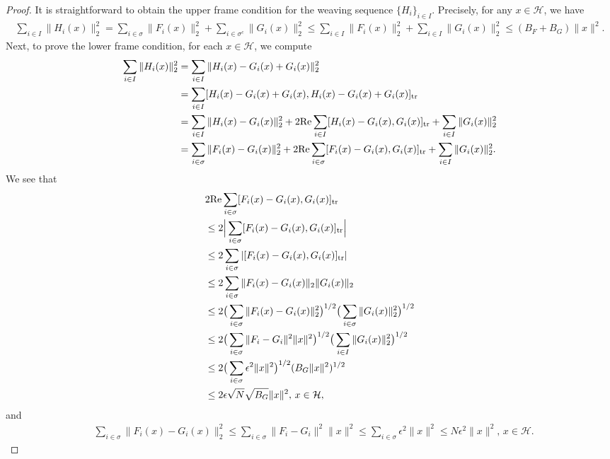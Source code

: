 \documentclass[reqno]{amsart}
\theoremstyle{plain}
\theoremstyle{remark}
\numberwithin{equation}{section}
\begin{document}
\begin{proof}
It is straightforward to obtain the upper frame condition for the weaving sequence $\{H_i\}_{i \in I}$. Precisely, for any $x \in \mathcal{H}$, we have
\begin{align*}
\sum_{i \in I} \|H_i(x)\|_2^2 =\sum_{i \in \sigma} \|F_i(x)\|_2^2 +\sum_{i \in \sigma^c} \|G_i(x)\|_2^2 \leq \sum_{i \in I} \|F_i(x)\|_2^2+\sum_{i \in I} \|G_i(x)\|_2^2 \leq (B_F + B_G)\|x\|^2.
\end{align*}
Next, to prove the lower frame condition, for each $x \in \mathcal{H}$, we compute
\begin{align}\label{eq2.1}
\sum_{i \in I} \|H_i(x)\|_2^2 &=\sum_{i \in I} \|H_i(x)-G_i(x)+G_i(x)\|_2^2\notag\\
& =\sum_{i \in I}[ H_i(x)-G_i(x)+G_i(x), H_i(x)-G_i(x)+G_i(x)]_{\text{tr}}\notag\\
&= \sum_{i \in I} \|H_i(x)-G_i(x)\|_2^2 + 2 \text{Re} \sum_{i \in I} [ H_i(x)-G_i(x), G_i(x) ]_{\text{tr}} + \sum_{i \in I} \|G_i(x)\|_2^2\notag\\
&= \sum_{i \in \sigma} \|F_i(x)-G_i(x)\|_2^2 + 2 \text{Re} \sum_{i \in \sigma} [ F_i(x)-G_i(x), G_i(x) ]_{\text{tr}} + \sum_{i \in I} \|G_i(x)\|_2^2.
\end{align}
We see that
\begin{align}\label{eq2.2}
&2 \text{Re} \sum_{i \in \sigma} [ F_i(x)-G_i(x), G_i(x) ]_{\text{tr}} \notag\\
& \leq 2 \Big|\sum_{i \in \sigma} [ F_i(x)-G_i(x), G_i(x) ]_{\text{tr}} \Big|\notag\\
& \leq 2 \sum_{i \in \sigma}| [ F_i(x)-G_i(x), G_i(x) ]_{\text{tr}}| \notag\\
& \leq 2 \sum_{i \in \sigma}\| F_i(x)-G_i(x)\|_2\| G_i(x)\|_2 \notag\\
&\leq 2 \big(\sum_{i \in \sigma}\| F_i(x)-G_i(x)\|_2^2\big)^{1/2}\big(\sum_{i \in \sigma}\| G_i(x)\|_2^2\big)^{1/2}\notag\\
& \leq 2 \big(\sum_{i \in \sigma}\| F_i-G_i\|^2\|x\|^2\big)^{1/2}\big(\sum_{i \in I}\| G_i(x)\|_2^2\big)^{1/2}\notag\\
&\leq 2 \big(\sum_{i \in \sigma}\epsilon^2\|x\|^2\big)^{1/2}(B_G\|x\|^2)^{1/2}\notag\\
& \leq 2\epsilon\sqrt{N} \sqrt{B_G}\|x\|^2, \, x \in \mathcal{H},
\end{align}
and
\begin{align}
&\sum_{i \in \sigma} \|F_i(x)-G_i(x)\|_2^2 \leq \sum_{i \in \sigma} \|F_i-G_i\|^2 \|x\|^2  \leq \sum_{i \in \sigma} \epsilon^2 \|x\|^2\leq N\epsilon^2 \|x\|^2, \, x \in \mathcal{H}. \label{eq2.3}

\end{align}
\end{proof}
\end{document}
